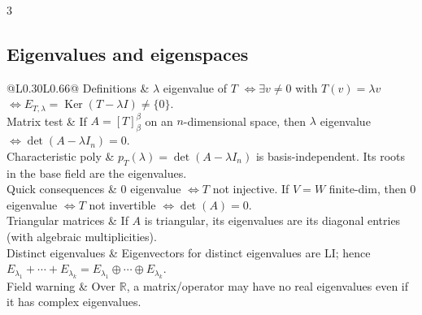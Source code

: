 \documentclass[10pt]{article}
\makeatletter
\newcommand{\R}{\mathbb{R}}
\newcommand{\Ker}{\operatorname{Ker}}
\newcommand{\cheattable}[1]{\begin{tabular}{@{}L{0.30\columnwidth}L{0.66\columnwidth}@{}}#1\end{tabular}}
\makeatother
\begin{document}
\begin{multicols}{3}
\subsection*{Eigenvalues and eigenspaces}
\cheattable{
Definitions & $\lambda$ eigenvalue of $T$ $\iff \exists v\neq 0$ with $T(v)=\lambda v$ $\iff E_{T,\lambda}=\Ker(T-\lambda I)\neq\{0\}$.\\
Matrix test & If $A=[T]^\beta_\beta$ on an $n$-dimensional space, then $\lambda$ eigenvalue $\iff \det(A-\lambda I_n)=0$.\\
Characteristic poly & $p_T(\lambda)=\det(A-\lambda I_n)$ is basis-independent. Its roots in the base field are the eigenvalues.\\
Quick consequences & $0$ eigenvalue $\iff T$ not injective. If $V=W$ finite-dim, then $0$ eigenvalue $\iff T$ not invertible $\iff \det(A)=0$.\\
Triangular matrices & If $A$ is triangular, its eigenvalues are its diagonal entries (with algebraic multiplicities).\\
Distinct eigenvalues & Eigenvectors for distinct eigenvalues are LI; hence $E_{\lambda_1}+\cdots+E_{\lambda_k}=E_{\lambda_1}\oplus\cdots\oplus E_{\lambda_k}$.\\
Field warning & Over $\R$, a matrix/operator may have no real eigenvalues even if it has complex eigenvalues.\\
}


\end{multicols}
\end{document}
